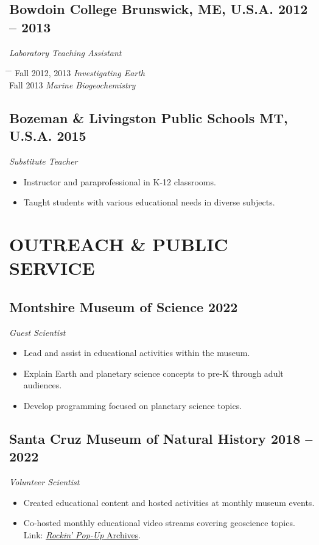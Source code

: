\documentclass[10pt]{article}
\begin{document}
\subsection*{\textbf{Bowdoin College} \hspace{15pt} Brunswick, ME, U.S.A. \hfill 2012 – 2013}
\textit{Laboratory Teaching Assistant}
\begin{tabbing} \hspace{10pt} \= \hspace{2.5cm} \=  \kill
\> Fall 2012, 2013 \> \textit{Investigating Earth}\\
\> Fall 2013 \> \textit{Marine Biogeochemistry}
\end{tabbing}

\subsection*{\textbf{Bozeman \& Livingston Public Schools} \hspace{15pt} MT, U.S.A. \hfill 2015}
\textit{Substitute Teacher}
\begin{itemize}
	\item Instructor and paraprofessional in K-12 classrooms.
	\item Taught students with various educational needs in diverse subjects.
\end{itemize}


\section*{OUTREACH \& PUBLIC SERVICE}

\subsection*{\textbf{Montshire Museum of Science} \hfill 2022}
\textit{Guest Scientist}
\begin{itemize}
\item Lead and assist in educational activities within the museum.
\item Explain Earth and planetary science concepts to pre-K through adult audiences.
\item Develop programming focused on planetary science topics.
\end{itemize}

\subsection*{\textbf{Santa Cruz Museum of Natural History} \hfill 2018 – 2022}
\textit{Volunteer Scientist}
\begin{itemize}
	\item Created educational content and hosted activities at monthly museum events.
	\item Co-hosted monthly educational video streams covering geoscience topics. \\
	Link: \href{https://www.santacruzmuseum.org/category/rockin-pop-up/}{\emph{Rockin' Pop-Up} Archives}.
\end{itemize}
\end{document}

